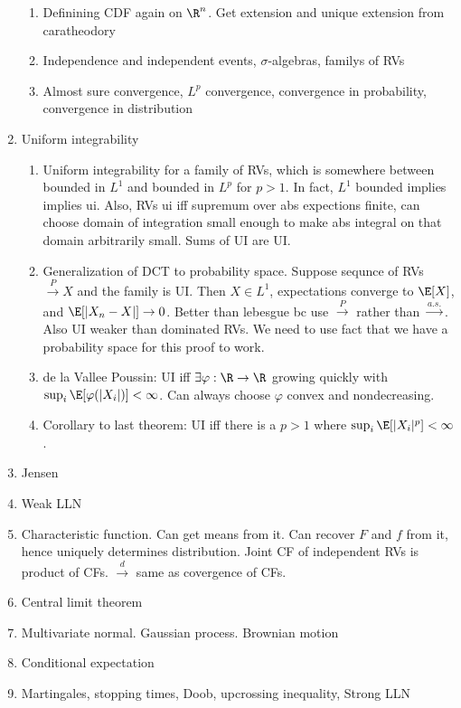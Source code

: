 \documentclass[12pt]{article}
\theoremstyle{plain}
\theoremstyle{definition}
\theoremstyle{remark}
\newcommand{\ra}{\rightarrow}
\newcommand{\asto}{\xrightarrow{a.s.}}
\newcommand{\pto}{\xrightarrow{P}}
\newcommand{\dto}{\xrightarrow{d}}
\begin{document}
\begin{enumerate}
\begin{enumerate}
      \item Definining CDF again on $\R^n$. Get extension and unique
        extension from caratheodory
      \item
        Independence and independent events, $\sigma$-algebras, familys
        of RVs

      \item Almost sure convergence, $L^p$ convergence, convergence in
        probability, convergence in distribution
    \end{enumerate}

  \item Uniform integrability
    \begin{enumerate}
      \item Uniform integrability for a family of RVs, which is somewhere
        between bounded in $L^1$ and bounded in $L^p$ for $p>1$.
        In fact, $L^1$ bounded implies implies ui.
        Also, RVs ui iff supremum over abs expections finite, can choose
        domain of integration small enough to make abs integral on that
        domain arbitrarily small.
        Sums of UI are UI.
      \item Generalization of DCT to probability space. Suppose sequnce of
        RVs $\pto X$ and the family is UI. Then $X\in L^1$, expectations
        converge to $\E[X]$, and $\E[|X_n-X|]\ra0$.
        Better than lebesgue bc use $\pto$ rather than $\asto$.
        Also UI weaker than dominated RVs. We need to use fact that we have
        a probability space for this proof to work.
      \item de la Vallee Poussin:
        UI iff $\exists\varphi:\R\ra\R$ growing quickly with
        $\sup_i \E[\varphi(|X_i|)]<\infty$. Can always choose $\varphi$
        convex and nondecreasing.
      \item Corollary to last theorem: UI iff there is a $p>1$ where
        $\sup_i\E[|X_i|^p]<\infty$.
    \end{enumerate}

  \item Jensen
  \item Weak LLN
  \item Characteristic function. Can get means from it.
    Can recover $F$ and $f$ from it, hence uniquely determines
    distribution. Joint CF of independent RVs is product of CFs.
    $\dto$ same as covergence of CFs.
  \item Central limit theorem

  \item Multivariate normal. Gaussian process.
    Brownian motion

  \item Conditional expectation
  \item Martingales, stopping times, Doob, upcrossing inequality, Strong
    LLN

\end{enumerate}
\end{document}
